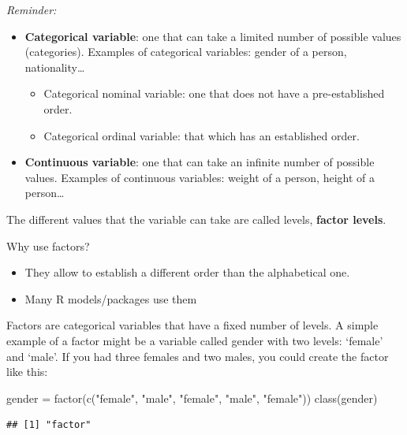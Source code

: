\documentclass[
]{book}
\newenvironment{Shaded}{\begin{snugshade}}{\end{snugshade}}
\newcommand{\FunctionTok}[1]{\textcolor[rgb]{0.00,0.00,0.00}{#1}}
\newcommand{\NormalTok}[1]{#1}
\newcommand{\OtherTok}[1]{\textcolor[rgb]{0.56,0.35,0.01}{#1}}
\newcommand{\StringTok}[1]{\textcolor[rgb]{0.31,0.60,0.02}{#1}}
\providecommand{\tightlist}{%
  \setlength{\itemsep}{0pt}\setlength{\parskip}{0pt}}
\theoremstyle{definition}
\theoremstyle{definition}
\theoremstyle{definition}
\theoremstyle{definition}
\theoremstyle{remark}
\begin{document}
\emph{Reminder:}

\begin{itemize}
\item
  \textbf{Categorical variable}: one that can take a limited number of possible values (categories). Examples of categorical variables: gender of a person, nationality\ldots{}

  \begin{itemize}
  \tightlist
  \item
    Categorical nominal variable: one that does not have a pre-established order.
  \item
    Categorical ordinal variable: that which has an established order.
  \end{itemize}
\item
  \textbf{Continuous variable}: one that can take an infinite number of possible values. Examples of continuous variables: weight of a person, height of a person\ldots{}
\end{itemize}

The different values that the variable can take are called levels, \textbf{factor levels}.

Why use factors?

\begin{itemize}
\tightlist
\item
  They allow to establish a different order than the alphabetical one.
\item
  Many R models/packages use them
\end{itemize}

Factors are categorical variables that have a fixed number of levels. A simple example of a factor might be a variable called gender with two levels: `female' and `male'. If you had three females and two males, you could create the factor like this:

\begin{Shaded}
\begin{Highlighting}[]
\NormalTok{gender }\OtherTok{=} \FunctionTok{factor}\NormalTok{(}\FunctionTok{c}\NormalTok{(}\StringTok{"female"}\NormalTok{, }\StringTok{"male"}\NormalTok{, }\StringTok{"female"}\NormalTok{, }\StringTok{"male"}\NormalTok{, }\StringTok{"female"}\NormalTok{))}
\FunctionTok{class}\NormalTok{(gender)}
\end{Highlighting}
\end{Shaded}

\begin{verbatim}
## [1] "factor"
\end{verbatim}
\end{document}
